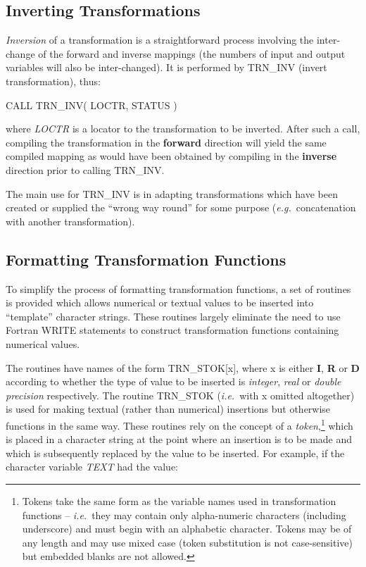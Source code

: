 \documentclass[twoside,nolof,11pt]{starlink}
\providecommand{\name}[1]{\small{#1}}
\providecommand{\fortvar}[1]{\emph{#1}}
\begin{document}
\subsection{Inverting Transformations}

\label{section:additional:inverting}

\emph{Inversion} of a transformation is a straightforward process involving
the inter-change of the forward and inverse mappings (the numbers of input
and output variables will also be inter-changed).
It is performed by \name{TRN\_INV} (invert transformation), thus:

\begin{terminalv}
CALL TRN_INV( LOCTR, STATUS )
\end{terminalv}

where \fortvar{LOCTR} is a locator to the transformation to be inverted.
After such a call, compiling the transformation in the \textbf{forward}
direction will yield the same compiled mapping as would have been obtained
by compiling in the \textbf{ inverse} direction prior to calling
\name{TRN\_INV}.

The main use for \name{TRN\_INV} is in adapting transformations which have
been created or supplied the ``wrong way round'' for some purpose
(\emph{e.g.}\ concatenation with another transformation).


\subsection{Formatting Transformation Functions}

\label{section:additional:formatting}

To simplify the process of formatting transformation functions, a set of
routines is provided which allows numerical or textual values to be inserted
into ``template'' character strings.
These routines largely eliminate the need to use \name{Fortran} \name{WRITE}
statements to construct transformation functions containing numerical
values.

The routines have names of the form \name{TRN\_STOK[x]}, where x is either
\textbf{I}, \textbf{R} or \textbf{D} according to whether the type of value
to be inserted is \emph{integer}, \emph{real} or \emph{double precision}
respectively.
The routine \name{TRN\_STOK} (\emph{i.e.}\ with x omitted altogether) is used
for making textual (rather than numerical) insertions but otherwise
functions in the same way.
These routines rely on the concept of a \emph{token},\footnote{
Tokens take the same form as the variable names used in transformation
functions -- \emph{i.e.}\ they may contain only alpha-numeric characters
(including underscore) and must begin with an alphabetic character.
Tokens may be of any length and may use mixed case (token substitution is
not case-sensitive) but embedded blanks are not allowed.}
which is placed in a character string at the point where an insertion is to
be made and which is subsequently replaced by the value to be inserted.
For example, if the character variable \fortvar{TEXT} had the value:
\end{document}
